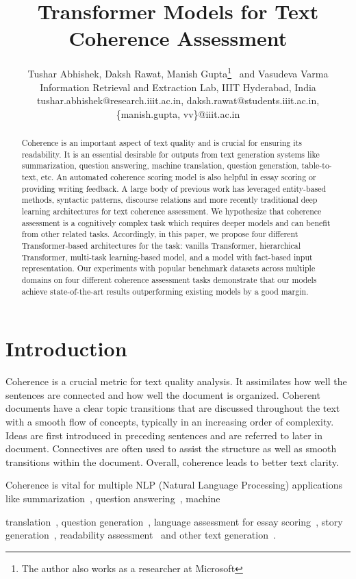 \documentclass[11pt]{article}
\title{Transformer Models for Text Coherence Assessment}
\author{Tushar Abhishek, Daksh Rawat, Manish Gupta\thanks{The author also works as a researcher at Microsoft}~ and Vasudeva Varma \\ Information Retrieval and Extraction Lab, IIIT Hyderabad, India \\
        tushar.abhishek@research.iiit.ac.in, daksh.rawat@students.iiit.ac.in, \\
        \{manish.gupta, vv\}@iiit.ac.in}
\begin{document}
\maketitle
\begin{abstract}
Coherence is an important aspect of text quality and is crucial for ensuring its readability. It is an essential desirable for outputs from text generation systems like summarization, question answering, machine translation, question generation, table-to-text, etc. An automated coherence scoring model is also helpful in essay scoring or providing writing feedback. 
A large body of previous work has leveraged entity-based methods, syntactic patterns, discourse relations and more recently traditional deep learning architectures for text coherence assessment. We hypothesize that coherence assessment is a cognitively complex task which requires deeper models and can benefit from other related tasks. Accordingly, in this paper, we propose four different Transformer-based architectures for the task: vanilla Transformer, hierarchical Transformer, multi-task learning-based model, and a model with fact-based input representation. 
Our experiments with popular benchmark datasets across multiple domains on four different coherence assessment tasks demonstrate that our models achieve state-of-the-art results outperforming existing models by a good margin.
\end{abstract}

\section{Introduction}
Coherence is a crucial metric for text quality analysis. It assimilates how well the sentences are connected and how well the document is organized. Coherent documents have a clear topic transitions that are discussed throughout the text with a smooth flow of concepts, typically in an increasing order of complexity. Ideas are first introduced in preceding sentences and are referred to later in document. Connectives are often used to assist the structure as well as smooth transitions within the document. Overall, coherence leads to better text clarity.


Coherence is vital for multiple NLP (Natural Language Processing) applications like summarization~\cite{barzilay2002inferring,parveen2016generating}, question answering~\cite{verberne2007evaluating}, machine 

 translation~\cite{xiong2019modeling,mohiuddin2020coheval}, question generation~\cite{desai2018generating}, language assessment for essay scoring~\cite{burstein2010using,somasundaran2014lexical,farag2018neural}, story generation~\cite{mcintyre2010plot}, readability assessment~\cite{pitler2010automatic,muangkammuen2020neural} and other text generation~\cite{park2015expressing,kiddon2016globally,holtzman2018learning}.
\end{document}
